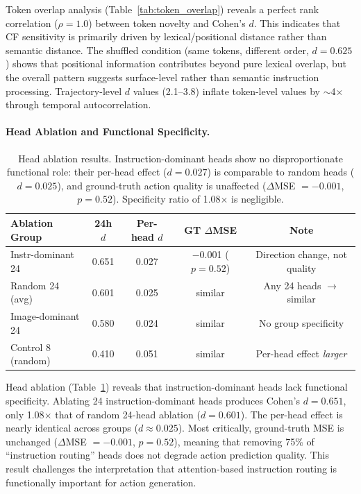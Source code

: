 \documentclass[letterpaper]{article}
\begin{document}
Token overlap analysis (Table~\ref{tab:token_overlap}) reveals a perfect rank correlation ($\rho = 1.0$) between token novelty and Cohen's $d$. This indicates that CF sensitivity is primarily driven by lexical/positional distance rather than semantic distance. The shuffled condition (same tokens, different order, $d = 0.625$) shows that positional information contributes beyond pure lexical overlap, but the overall pattern suggests surface-level rather than semantic instruction processing. Trajectory-level $d$ values (2.1--3.8) inflate token-level values by $\sim$4$\times$ through temporal autocorrelation.

\paragraph{Head Ablation and Functional Specificity.}

\begin{table}[h]
\centering
\caption{Head ablation results. Instruction-dominant heads show no disproportionate functional role: their per-head effect ($d = 0.027$) is comparable to random heads ($d = 0.025$), and ground-truth action quality is unaffected ($\Delta$MSE $= -0.001$, $p = 0.52$). Specificity ratio of 1.08$\times$ is negligible.}
\label{tab:head_ablation}
\begin{tabular}{lcccc}
\toprule
Ablation Group & 24h $d$ & Per-head $d$ & GT $\Delta$MSE & Note \\
\midrule
Instr-dominant 24 & 0.651 & 0.027 & $-$0.001 ($p = 0.52$) & Direction change, not quality \\
Random 24 (avg) & 0.601 & 0.025 & similar & Any 24 heads $\to$ similar \\
Image-dominant 24 & 0.580 & 0.024 & similar & No group specificity \\
Control 8 (random) & 0.410 & 0.051 & similar & Per-head effect \emph{larger} \\
\bottomrule
\end{tabular}
\end{table}

Head ablation (Table~\ref{tab:head_ablation}) reveals that instruction-dominant heads lack functional specificity. Ablating 24 instruction-dominant heads produces Cohen's $d = 0.651$, only 1.08$\times$ that of random 24-head ablation ($d = 0.601$). The per-head effect is nearly identical across groups ($d \approx 0.025$). Most critically, ground-truth MSE is unchanged ($\Delta$MSE $= -0.001$, $p = 0.52$), meaning that removing 75\% of ``instruction routing'' heads does not degrade action prediction quality. This result challenges the interpretation that attention-based instruction routing is functionally important for action generation.
\end{document}
